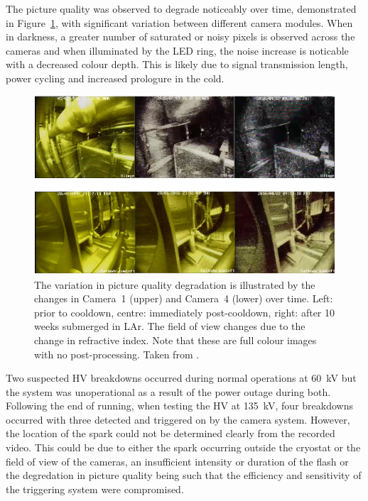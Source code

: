 The picture quality was observed to degrade noticeably over time, demonstrated in Figure~\ref{fig:35tonCamerasDegredation}, with significant variation between different camera modules.  When in darkness, a greater number of saturated or noisy pixels is observed across the cameras and when illuminated by the LED ring, the noise increase is noticable with a decreased colour depth.  This is likely due to signal transmission length, power cycling and increased prologure in the cold.

\begin{figure}
  \centering
  \includegraphics[width=12cm]{35tonCamerasDegredation.pdf}
  \caption[The variation in picture quality degradation in the 35~ton camera system is illustrated by the changes in Camera~1 and Camera~4 over time.]{The variation in picture quality degradation is illustrated by the changes in Camera~1 (upper) and Camera~4 (lower) over time. Left: prior to cooldown, centre: immediately post-cooldown, right: after 10 weeks submerged in LAr.  The field of view changes due to the change in refractive index.  Note that these are full colour images with no post-processing.  Taken from \cite{35tonCameras2017}.}
  \label{fig:35tonCamerasDegredation}
\end{figure}

Two suspected HV breakdowns occurred during normal operations at 60~kV but the system was unoperational as a result of the power outage during both.  Following the end of running, when testing the HV at 135~kV, four breakdowns occurred with three detected and triggered on by the camera system.  However, the location of the spark could not be determined clearly from the recorded video. This could be due to either the spark occurring outside the cryostat or the field of view of the cameras, an insufficient intensity or duration of the flash or the degredation in picture quality being such that the efficiency and sensitivity of the triggering system were compromised.

